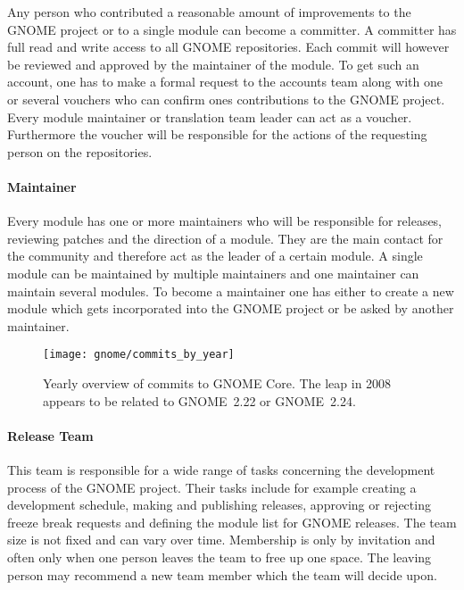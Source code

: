 Any person who contributed a reasonable amount of improvements to the GNOME
project or to a single module can become a committer. A committer has full read
and write access to all GNOME repositories. Each commit will however be
reviewed and approved by the maintainer of the module. To get such an account,
one has to make a formal request to the accounts team along with one or several
vouchers who can confirm ones contributions to the GNOME project. Every module
maintainer or translation team leader can act as a voucher. Furthermore the
voucher will be responsible for the actions of the requesting person on the
repositories.

\paragraph{Maintainer}

Every module has one or more maintainers who will be responsible for releases,
reviewing patches and the direction of a module. They are the main contact for
the community and therefore act as the leader of a certain module. A single
module can be maintained by multiple maintainers and one maintainer can
maintain several modules. To become a maintainer one has either to create a new
module which gets incorporated into the GNOME project or be asked by another
maintainer.

\begin{figure}[htbp]
  \centering
  \texttt{[image: gnome/commits\_by\_year]}
  \caption[Commits by Year, GNOME]
  {Yearly overview of commits to GNOME Core. The leap in 2008 appears to be
    related to GNOME~2.22 or GNOME~2.24.}
\end{figure}

\paragraph{Release Team}

This team is responsible for a wide range of tasks concerning the development
process of the GNOME project. Their tasks include for example creating a
development schedule, making and publishing releases, approving or rejecting
freeze break requests and defining the module list for GNOME releases. The team
size is not fixed and can vary over time. Membership is only by invitation and
often only when one person leaves the team to free up one space. The leaving
person may recommend a new team member which the team will decide upon.

